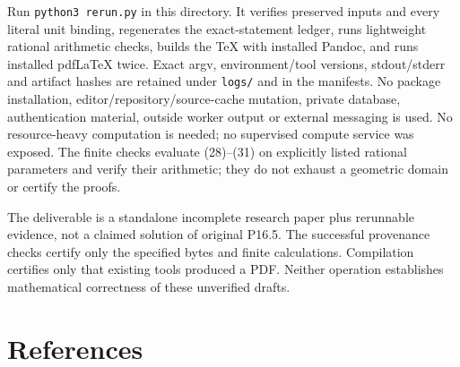 \documentclass[
  10pt,
]{article}
\begin{document}
Run \texttt{python3\ rerun.py} in this directory. It verifies preserved
inputs and every literal unit binding, regenerates the exact-statement
ledger, runs lightweight rational arithmetic checks, builds the TeX with
installed Pandoc, and runs installed pdfLaTeX twice. Exact argv,
environment/tool versions, stdout/stderr and artifact hashes are
retained under \texttt{logs/} and in the manifests. No package
installation, editor/repository/source-cache mutation, private database,
authentication material, outside worker output or external messaging is
used. No resource-heavy computation is needed; no supervised compute
service was exposed. The finite checks evaluate (28)--(31) on explicitly
listed rational parameters and verify their arithmetic; they do not
exhaust a geometric domain or certify the proofs.

The deliverable is a standalone incomplete research paper plus
rerunnable evidence, not a claimed solution of original P16.5. The
successful provenance checks certify only the specified bytes and finite
calculations. Compilation certifies only that existing tools produced a
PDF. Neither operation establishes mathematical correctness of these
unverified drafts.

\section{References}\label{references}
\end{document}
